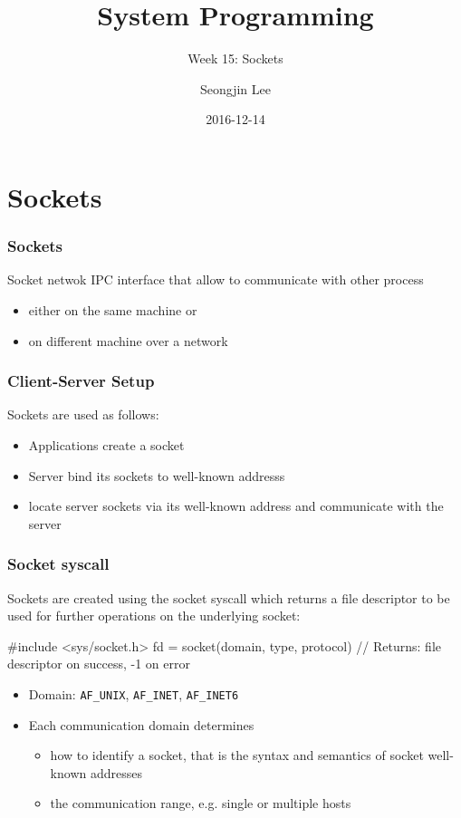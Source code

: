 \documentclass[newPxFont,sthlmFooter,nooffset]{beamer}
\title{System Programming}
\subtitle{Week 15: Sockets}
\author[SJL]{Seongjin Lee}
\institute{\href{mailto:insight@hanyang.ac.kr}{insight@hanyang.ac.kr}\\\url{http://esos.hanyang.ac.kr}\\Esos Lab. Hanyang University}
\date{2016-12-14}
\begin{document}
\frame[plain]{\titlepage} 




\section{Sockets}

\begin{frame}[t, fragile]
  \frametitle{Sockets}
Socket netwok IPC interface that allow to communicate with other process 
\begin{itemize}
\item either on the same machine or
\item on different machine over a network
\end{itemize}
\end{frame}


\begin{frame}[t, fragile]
  \frametitle{Client-Server Setup}
Sockets are used as follows:
\begin{itemize}
\item Applications create a socket
\item Server bind its sockets to well-known addresss
\item locate server sockets via its well-known address and communicate with the server
\end{itemize}


\end{frame}


\begin{frame}[t, fragile]
  \frametitle{Socket syscall}
Sockets are created using the socket syscall which returns a file descriptor to be used for further operations on the underlying socket:

\begin{codedef}
#include <sys/socket.h>
fd = socket(domain, type, protocol)
// Returns: file descriptor on success, -1 on error  
\end{codedef}


\begin{itemize}
\item Domain: \texttt{AF\_UNIX}, \texttt{AF\_INET}, \texttt{AF\_INET6}
\item Each communication domain determines 
  \begin{itemize}
  \item how to identify a socket, that is the syntax and semantics of socket well-known addresses
  \item the communication range, e.g. single or multiple hosts
  \end{itemize}
\end{itemize}

\end{frame}
\end{document}

